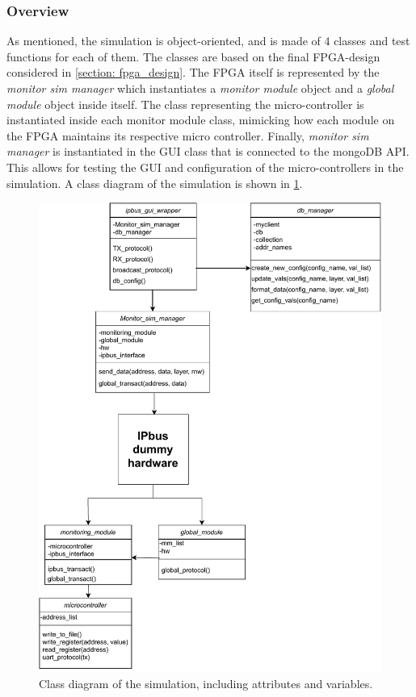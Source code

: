 \documentclass[main.tex]{subfiles}
\begin{document}
\subsubsection{Overview}
As mentioned, the simulation is object-oriented, and is made of 4 classes and test functions for each of them. The classes are based on the final FPGA-design considered in \ref{section: fpga_design}. The FPGA itself is represented by the \textit{monitor sim manager} which instantiates a \textit{monitor module} object and a \textit{global module} object inside itself. The class representing the micro-controller is instantiated inside each monitor module class, mimicking how each module on the FPGA maintains its respective micro controller. Finally, \textit{monitor sim manager} is instantiated in the GUI class that is connected to the mongoDB API. This allows for testing the GUI and configuration of the micro-controllers in the simulation.  A class diagram of the simulation is shown in \ref{fig: class_diagram}.

\begin{figure}[!ht]
    \centering
    \includegraphics[width=14cm]{images/class chart.pdf}
    \caption{Class diagram of the simulation, including attributes and variables.}
    \label{fig: class_diagram}
\end{figure}
\FloatBarrier
\end{document}
